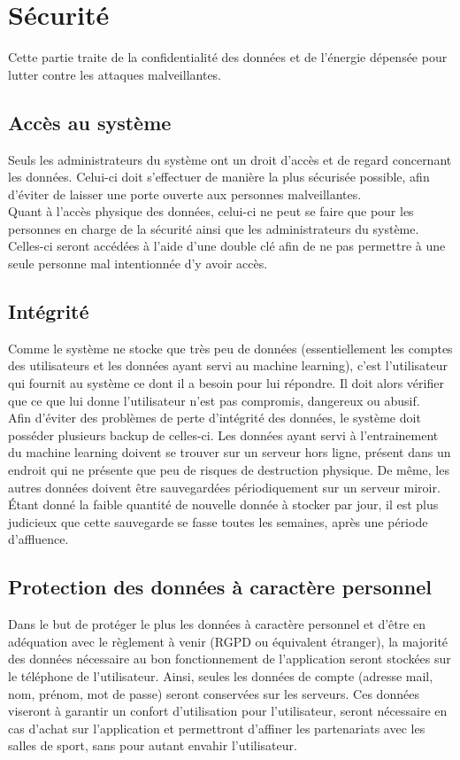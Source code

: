 \section{Sécurité}
Cette partie traite de la confidentialité des données et de l'énergie dépensée pour lutter contre les attaques malveillantes.

\subsection*{Accès au système}
Seuls les administrateurs du système ont un droit d'accès et de regard concernant les données. Celui-ci doit s'effectuer de manière la plus sécurisée possible, afin d'éviter de laisser une porte ouverte aux personnes malveillantes.\\

Quant à l'accès physique des données, celui-ci ne peut se faire que pour les personnes en charge de la sécurité ainsi que les administrateurs du système. Celles-ci seront accédées à l'aide d'une double clé afin de ne pas permettre à une seule personne mal intentionnée d'y avoir accès.

\subsection*{Intégrité}
Comme le système ne stocke que très peu de données (essentiellement les comptes des utilisateurs et les données ayant servi au machine learning), c'est l'utilisateur qui fournit au système ce dont il a besoin pour lui répondre. Il doit alors vérifier que ce que lui donne l'utilisateur n'est pas compromis, dangereux ou abusif.\\

Afin d'éviter des problèmes de perte d'intégrité des données, le système doit posséder plusieurs backup de celles-ci. Les données ayant servi à l'entrainement du machine learning doivent se trouver sur un serveur hors ligne, présent dans un endroit qui ne présente que peu de risques de destruction physique. De même, les autres données doivent être sauvegardées périodiquement sur un serveur miroir. \'Etant donné la faible quantité de nouvelle donnée à stocker par jour, il est plus judicieux que cette sauvegarde se fasse toutes les semaines, après une période d'affluence.

\subsection*{Protection des données à caractère personnel}
Dans le but de protéger le plus les données à caractère personnel et d'être en adéquation avec le règlement à venir (RGPD ou équivalent étranger), la majorité des données nécessaire au bon fonctionnement de l'application seront stockées sur le téléphone de l'utilisateur. Ainsi, seules les données de compte (adresse mail, nom, prénom, mot de passe) seront conservées sur les serveurs. Ces données viseront à garantir un confort d'utilisation pour l'utilisateur, seront nécessaire en cas d'achat sur l'application et permettront d'affiner les partenariats avec les salles de sport, sans pour autant envahir l'utilisateur.\\

